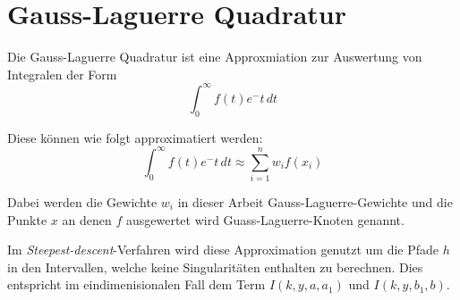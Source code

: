\section{Gauss-Laguerre Quadratur}

Die Gauss-Laguerre Quadratur ist eine Approxmiation zur Auswertung von Integralen der Form
\begin{equation}
    \int_{0}^{\infty} f(t) e^-t  \,dt 
\end{equation}

Diese können wie folgt approximatiert werden:
\begin{equation}
    \int_{0}^{\infty} f(t) e^-t  \,dt  \approx \sum_{i = 1}^{n} w_if(x_i) 
\end{equation}

Dabei werden die Gewichte $w_i$ in dieser Arbeit Gauss-Laguerre-Gewichte und die Punkte $x$ an denen $f$ ausgewertet wird Guass-Laguerre-Knoten genannt.

Im \textit{Steepest-descent}-Verfahren wird diese Approximation genutzt um die Pfade $h$ in den Intervallen, welche keine Singularitäten enthalten zu berechnen.
Dies entspricht im eindimenisionalen Fall dem Term $I(k,y,a,a_1)$ und $I(k,y,b_1,b)$.









